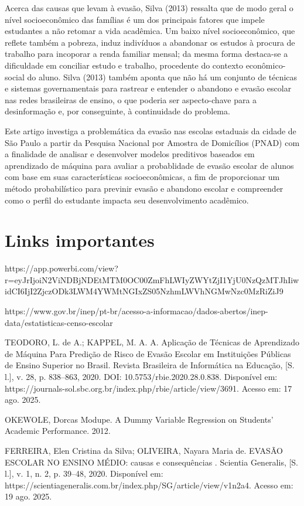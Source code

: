\documentclass[english, spanish, brazilian]{RBIEarticle} %
\begin{document}
Acerca das causas que levam à evasão, Silva (2013) ressalta que de modo geral o nível socioeconômico das famílias é um dos principais fatores que impele estudantes a não retomar a vida acadêmica. Um baixo nível socioeconômico, que reflete também a pobreza, induz indivíduos a abandonar os estudos à procura de trabalho para incoporar a renda familiar mensal; da mesma forma destaca-se a dificuldade em conciliar estudo e trabalho, procedente do contexto econômico-social do aluno. Silva (2013) também aponta que não há um conjunto de técnicas e sistemas governamentais para rastrear e entender o abandono e evasão escolar nas redes brasileiras de ensino, o que poderia ser aspecto-chave para a desinformação e, por conseguinte, à continuidade do problema.

Este artigo investiga a problemática da evasão nas escolas estaduais da cidade de São Paulo a partir da Pesquisa Nacional por Amostra de Domicílios (PNAD) com a finalidade de analisar e desenvolver modelos preditivos baseados em aprendizado de máquina para avaliar a probablidade de evasão escolar de alunos com base em suas características socioeconômicas, a fim de proporcionar um método probabilístico para previnir evasão e abandono escolar e compreender como o perfil do estudante impacta seu desenvolvimento acadêmico. 

\section{Links importantes}
https://app.powerbi.com/view?r=eyJrIjoiN2ViNDBjNDEtMTM0OC00ZmFhLWIyZWYtZjI1YjU0NzQzMTJhIiwidCI6IjI2ZjczODk3LWM4YWMtNGIxZS05NzhmLWVhNGMwNzc0MzRiZiJ9

https://www.gov.br/inep/pt-br/acesso-a-informacao/dados-abertos/inep-data/estatisticas-censo-escolar

TEODORO, L. de A.; KAPPEL, M. A. A. Aplicação de Técnicas de Aprendizado de Máquina Para Predição de Risco de Evasão Escolar em Instituições Públicas de Ensino Superior no Brasil. Revista Brasileira de Informática na Educação, [S. l.], v. 28, p. 838–863, 2020. DOI: 10.5753/rbie.2020.28.0.838. Disponível em: https://journals-sol.sbc.org.br/index.php/rbie/article/view/3691. Acesso em: 17 ago. 2025.

OKEWOLE, Dorcas Modupe. A Dummy Variable Regression on Students' Academic Performance. 2012.

FERREIRA, Elen Cristina da Silva; OLIVEIRA, Nayara Maria de. EVASÃO ESCOLAR NO ENSINO MÉDIO: causas e consequências . Scientia Generalis, [S. l.], v. 1, n. 2, p. 39–48, 2020. Disponível em: https://scientiageneralis.com.br/index.php/SG/article/view/v1n2a4. Acesso em: 19 ago. 2025.
\end{document}
